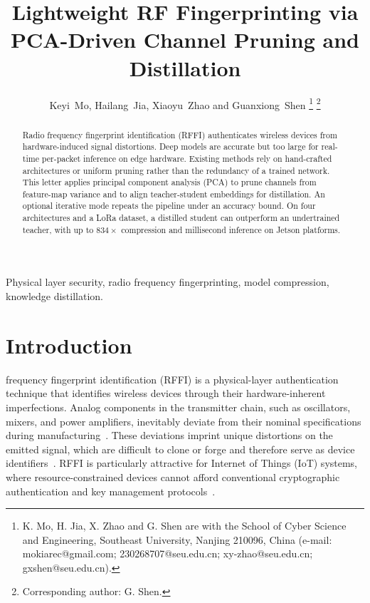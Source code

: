 \documentclass[journal,comsoc]{IEEEtran}
\begin{document}
\title{Lightweight RF Fingerprinting via PCA-Driven Channel Pruning and Distillation}

\author{Keyi~Mo, Hailang~Jia, Xiaoyu~Zhao and Guanxiong~Shen%
\thanks{K. Mo, H. Jia, X. Zhao and G. Shen are with the School of Cyber Science and Engineering, Southeast University, Nanjing 210096, China (e-mail: mokiarec@gmail.com; 230268707@seu.edu.cn; xy-zhao@seu.edu.cn; gxshen@seu.edu.cn).}%
\thanks{Corresponding author: G. Shen.}%
}

\maketitle


\begin{abstract}
Radio frequency fingerprint identification (RFFI) authenticates wireless devices from hardware-induced signal distortions.
Deep models are accurate but too large for real-time per-packet inference on edge hardware.
Existing methods rely on hand-crafted architectures or uniform pruning rather than the redundancy of a trained network.
This letter applies principal component analysis (PCA) to prune channels from feature-map variance and to align teacher-student embeddings for distillation.
An optional iterative mode repeats the pipeline under an accuracy bound.
On four architectures and a LoRa dataset, a distilled student can outperform an undertrained teacher, with up to $834\times$ compression and millisecond inference on Jetson platforms.
\end{abstract}


\begin{IEEEkeywords}
Physical layer security, radio frequency fingerprinting, model compression, knowledge distillation.
\end{IEEEkeywords}


\section{Introduction}
\label{sec:intro}

 frequency fingerprint identification (RFFI) is a physical-layer authentication technique that identifies wireless devices through their hardware-inherent imperfections.
Analog components in the transmitter chain, such as oscillators, mixers, and power amplifiers, inevitably deviate from their nominal specifications during manufacturing~\cite{polak2011identifying,zhang2021radio}.
These deviations imprint unique distortions on the emitted signal, which are difficult to clone or forge and therefore serve as device identifiers~\cite{peng2019design,zhang2025physical}.
RFFI is particularly attractive for Internet of Things (IoT) systems, where resource-constrained devices cannot afford conventional cryptographic authentication and key management protocols~\cite{zhang2025physical}.
\end{document}
